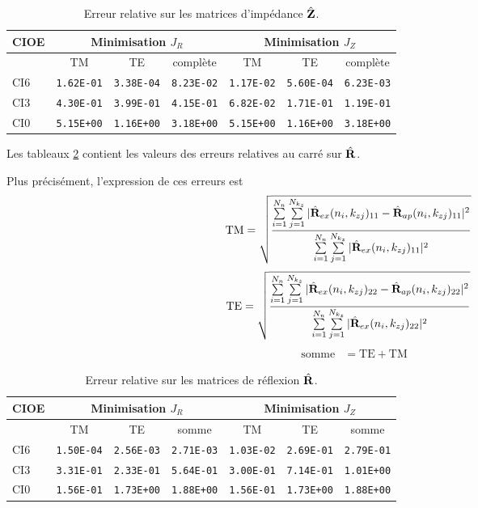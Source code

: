   \begin{table}[!hbt]
    \centering
    \begin{tabular}{l|ccc|ccc}
      CIOE & \multicolumn{3}{c}{Minimisation \(J_R\)} & \multicolumn{3}{c}{Minimisation \(J_Z\)}\\
      \hline
      \hline
          & {TM} & {TE} & {complète} & {TM} & {TE} & {complète}\\
      \hline
      CI6 & \verb|1.62E-01| & \verb|3.38E-04| & \verb|8.23E-02| & \verb|1.17E-02| & \verb|5.60E-04| & \verb|6.23E-03|\\
      CI3 & \verb|4.30E-01| & \verb|3.99E-01| & \verb|4.15E-01| & \verb|6.82E-02| & \verb|1.71E-01| & \verb|1.19E-01|\\
      CI0 & \verb|5.15E+00| & \verb|1.16E+00| & \verb|3.18E+00| & \verb|5.15E+00| & \verb|1.16E+00| & \verb|3.18E+00|
    \end{tabular}
    \caption{Erreur relative sur les matrices d'impédance \(\hat{\mathbf{Z}}\).}
    \label{tab:cylindre:hoppe:62:erreurs_Z}
  \end{table}

  Les tableaux \ref{tab:cylindre:hoppe:62:erreurs_R} contient les valeurs des erreurs relatives au carré sur \(\hat{\mathbf{R}}\). 

  Plus précisément, l'expression de ces erreurs est 
  \begin{align*}
    \text{TM} &= \sqrt{\dfrac{\sum\limits_{i=1}^{N_n}\sum\limits_{j=1}^{N_{k_z}}|\hat{\mathbf{R}}_{ex}(n_i,k_{zj})_{11}-\hat{\mathbf{R}}_{ap}(n_i,k_{zj})_{11}|^2}{\sum\limits_{i=1}^{N_n}\sum\limits_{j=1}^{N_{k_z}}|\hat{\mathbf{R}}_{ex}(n_i,k_{zj})_{11}|^2}}
  \end{align*}
  \begin{align*}
    \text{TE} &= \sqrt{\dfrac{\sum\limits_{i=1}^{N_n}\sum\limits_{j=1}^{N_{k_z}}|\hat{\mathbf{R}}_{ex}(n_i,k_{zj})_{22}-\hat{\mathbf{R}}_{ap}(n_i,k_{zj})_{22}|^2}{\sum\limits_{i=1}^{N_n}\sum\limits_{j=1}^{N_{k_z}}|\hat{\mathbf{R}}_{ex}(n_i,k_{zj})_{22}|^2}}
  \end{align*}
  \begin{align*}
    \text{somme}  &= \text{TE} + \text{TM}
  \end{align*}

  \begin{table}[!hbt]
    \centering
    \begin{tabular}{l|ccc|ccc}
      CIOE & \multicolumn{3}{c}{Minimisation \(J_R\)} & \multicolumn{3}{c}{Minimisation \(J_Z\)}\\
      \hline
      \hline
          & {TM} & {TE} & {somme} & {TM} & {TE} & {somme}\\
      \hline 
      CI6 & \verb|1.50E-04| & \verb|2.56E-03| & \verb|2.71E-03| & \verb|1.03E-02| & \verb|2.69E-01| & \verb|2.79E-01|\\
      CI3 & \verb|3.31E-01| & \verb|2.33E-01| & \verb|5.64E-01| & \verb|3.00E-01| & \verb|7.14E-01| & \verb|1.01E+00|\\
      CI0 & \verb|1.56E-01| & \verb|1.73E+00| & \verb|1.88E+00| & \verb|1.56E-01| & \verb|1.73E+00| & \verb|1.88E+00|  
    \end{tabular}
    \caption{Erreur relative sur les matrices de réflexion \(\hat{\mathbf{R}}\).}
    \label{tab:cylindre:hoppe:62:erreurs_R}
  \end{table}
